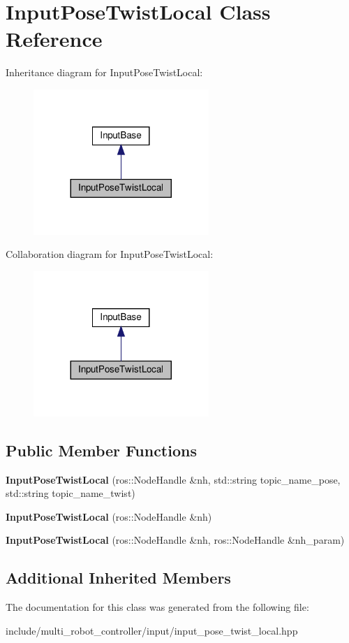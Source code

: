 \hypertarget{classInputPoseTwistLocal}{}\section{Input\+Pose\+Twist\+Local Class Reference}
\label{classInputPoseTwistLocal}


Inheritance diagram for Input\+Pose\+Twist\+Local\+:
\nopagebreak
\begin{figure}[H]
\begin{center}
\leavevmode
\includegraphics[width=188pt]{de/d87/classInputPoseTwistLocal__inherit__graph}
\end{center}
\end{figure}


Collaboration diagram for Input\+Pose\+Twist\+Local\+:
\nopagebreak
\begin{figure}[H]
\begin{center}
\leavevmode
\includegraphics[width=188pt]{de/ddd/classInputPoseTwistLocal__coll__graph}
\end{center}
\end{figure}
\subsection*{Public Member Functions}
\begin{DoxyCompactItemize}
\item 
{\bfseries Input\+Pose\+Twist\+Local} (ros\+::\+Node\+Handle \&nh, std\+::string topic\+\_\+name\+\_\+pose, std\+::string topic\+\_\+name\+\_\+twist)
\item 
{\bfseries Input\+Pose\+Twist\+Local} (ros\+::\+Node\+Handle \&nh)
\item 
{\bfseries Input\+Pose\+Twist\+Local} (ros\+::\+Node\+Handle \&nh, ros\+::\+Node\+Handle \&nh\+\_\+param)
\end{DoxyCompactItemize}
\subsection*{Additional Inherited Members}


The documentation for this class was generated from the following file\+:\begin{DoxyCompactItemize}
\item 
include/multi\+\_\+robot\+\_\+controller/input/input\+\_\+pose\+\_\+twist\+\_\+local.\+hpp\end{DoxyCompactItemize}
